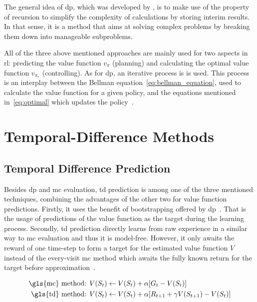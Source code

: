 \documentclass[draft,final]{vutinfth} %
\begin{document}
    The general idea of \gls{dp}, which was developed by \citeauthor{bellman_theory_1954}, is to make use of the property of recursion to simplify the complexity of calculations by storing interim results.
    In that sense, it is a method that aims at solving complex problems by breaking them down into manageable subproblems.

    All of the three above mentioned approaches are mainly used for two aspects in \gls{rl}: predicting the value function $v_\pi$ (planning) and calculating the optimal value function $v_{\pi_*}$ (controlling).
    As for \gls{dp}, an iterative process is is used.
    This process is an interplay between the Bellman equation~\eqref{eq:bellman_equation}, used to calculate the value function for a given policy, and the equations mentioned in~\eqref{eq:optimal} which updates the policy~.


    \section{Temporal-Difference Methods}


    \subsection{Temporal Difference Prediction}
    Besides \gls{dp} and \gls{mc} evaluation, \gls{td} prediction is among one of the three mentioned techniques, combining the advantages of the other two for value function predictions.
    Firstly, it uses the benefit of bootstrapping offered by \gls{dp}~\citep{szepesvari_algorithms_2010}.
    That is the usage of predictions of the value function as the target during the learning process.
    Secondly, \gls{td} prediction directly learns from raw experience in a similar way to \gls{mc} evaluation and thus it is model-free.
    However, it only awaits the reward of one time-step to form a target for the estimated value function $V$ instead of the every-visit \gls{mc} method which awaits the fully known return for the target before approximation~\citep{sutton_reinforcement_2018}.

    \begin{equation}
        \begin{aligned}[t]
            \text{\gls{mc} method: } & V(S_t) \leftarrow V(S_t) + \alpha [G_t - V(S_t)]\\
            \text{\gls{td} method: } & V(S_t) \leftarrow V(S_t) + \alpha [R_{t+1} + \gamma V(S_{t+1})-V(S_t)]\\
        \end{aligned}\label{eq:td_versus_mc}
    \end{equation}
\end{document}
